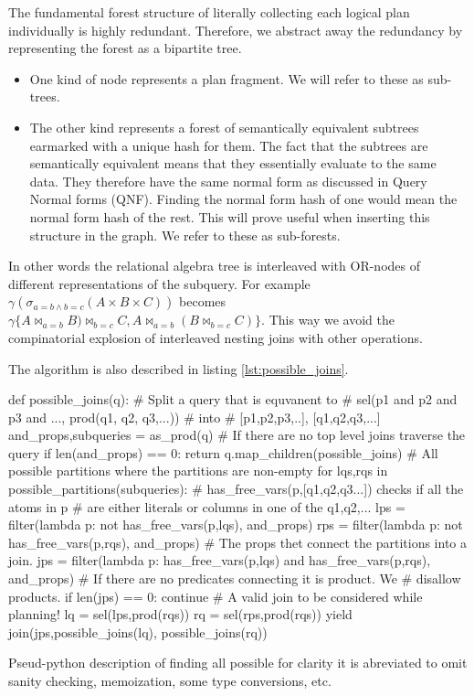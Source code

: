 The fundamental forest structure of literally collecting each logical
plan individually is highly redundant. Therefore, we abstract away the
redundancy by representing the forest as a bipartite tree.

\begin{itemize}
\item One kind of node represents a plan fragment. We will refer to
  these as sub-trees.
\item The other kind represents a forest of semantically equivalent
  subtrees earmarked with a unique hash for them. The fact that the
  subtrees are semantically equivalent means that they essentially
  evaluate to the same data. They therefore have the same normal form
  as discussed in Query Normal forms (QNF). Finding the normal form
  hash of one would mean the normal form hash of the rest. This will
  prove useful when inserting this structure in the graph. We refer to
  these as sub-forests.
\end{itemize}

In other words the relational algebra tree is interleaved with
OR-nodes of different representations of the subquery. For example
\(\gamma(\sigma_{a=b \land b=c}(A \times B \times C))\) becomes
\(\gamma\{A \Join_{a=b} B) \Join_{b=c} C, A \Join_{a=b} (B \Join_{b=c}
C)\}\). This way we avoid the compinatorial explosion of interleaved
nesting joins with other operations.

The algorithm is also described in listing \ref{lst:possible_joins}.

\begin{code}
  \begin{pycode}
    def possible_joins(q):
        # Split a query that is equvanent to
        # sel(p1 and p2 and p3 and ..., prod(q1, q2, q3,...))
        # into
        # [p1,p2,p3,..], [q1,q2,q3,...]
        and_props,subqueries =  as_prod(q)
        # If there are no top level joins traverse the query
        if len(and_props) == 0:
            return q.map_children(possible_joins)
        # All possible partitions where the partitions are non-empty
        for lqs,rqs in possible_partitions(subqueries):
            # has_free_vars(p,[q1,q2,q3...]) checks if all the atoms in p
            # are either literals or columns in one of the q1,q2,...
            lps = filter(lambda p: not has_free_vars(p,lqs), and_props)
            rps = filter(lambda p: not has_free_vars(p,rqs), and_props)
            # The props thet connect the partitions into a join.
            jps = filter(lambda p: has_free_vars(p,lqs)
                         and has_free_vars(p,rqs),
                         and_props)
            # If there are no predicates connecting it is product. We
            # disallow products.
            if len(jps) == 0: continue
            # A valid join to be considered while planning!
            lq = sel(lps,prod(rqs))
            rq = sel(rps,prod(rqs))
            yield join(jps,possible_joins(lq), possible_joins(rq))
  \end{pycode}
  \label{lst:possible_joins}
  \caption{Pseud-python description of finding all
    possible for clarity it is abreviated to omit sanity checking,
    memoization, some type conversions, etc.}
\end{code}

